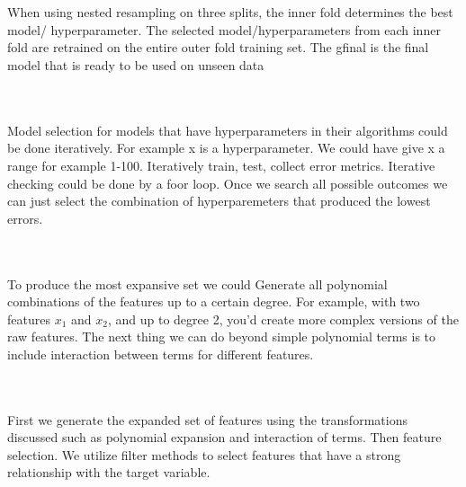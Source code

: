 \documentclass[12pt]{article}
\begin{document}
\begin{enumerate}
 \\ \\ 
When using nested resampling on three splits, the inner fold determines the best
model/ hyperparameter. The selected model/hyperparameters from each inner fold
are retrained on the entire outer fold training set. The gfinal is the final model that is
ready to be used on unseen data

 \\ \\ 
Model selection for models that have hyperparameters in their algorithms could be done iteratively. For example x is a hyperparameter. We could have give x a range for example 1-100. Iteratively train, test, collect error metrics. Iterative checking could be done by a foor loop. Once we search all possible outcomes we can just select the combination of hyperparemeters that produced the lowest errors. 

 \\ \\ 
To produce the most expansive set we could Generate all polynomial combinations of the features up to a certain degree. For example, with two features $x_1$ and $x_2$, and up to degree 2, you'd create more complex versions of the raw features. The next thing we can do beyond simple polynomial terms is to include interaction between terms for different features. 

 \\ \\ First we generate the expanded set of features using the transformations discussed such as polynomial expansion and interaction of terms. Then feature selection. We utilize filter methods to select features that have a strong relationship with the target variable. 

\end{enumerate}

\newpage
\end{document}

